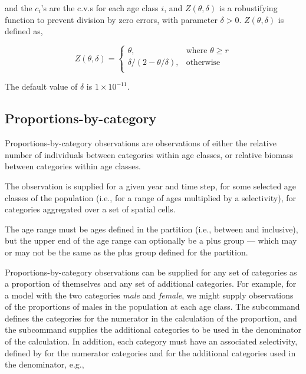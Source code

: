 and the $c_i$'s are the c.v.s for each age class $i$, and $Z \left(\theta,\delta \right)$ is a robustifying function to prevent division by zero errors, with parameter $\delta>0$. $Z \left(\theta,\delta \right)$ is defined as,

\begin{equation}
   Z \left(\theta,\delta \right) = \begin{cases}
	  \theta, & \text{where $\theta \ge r$} \\
	  \delta/\left( 2-\theta/\delta \right), & \text{otherwise} \\  
  \end{cases}
\end{equation}

The default value of $\delta$ is $1 \times 10^{-11}$.


\subsection{Proportions-by-category}

Proportions-by-category observations are observations of either the relative number of individuals between categories within age classes, or relative biomass between categories within age classes. 

The observation is supplied for a given year and time step, for some selected age classes of the population (i.e., for a range of ages multiplied by a selectivity), for categories aggregated over a set of spatial cells. 

The age range must be ages defined in the partition (i.e., between  and  inclusive), but the upper end of the age range can optionally be a plus group --- which may or may not be the same as the plus group defined for the partition. 

Proportions-by-category observations can be supplied for any set of categories as a proportion of themselves and any set of additional categories. For example, for a model with the two categories \emph{male} and \emph{female}, we might supply observations of the proportions of males in the population at each age class. The subcommand  defines the categories for the numerator in the calculation of the proportion, and the subcommand  supplies the additional categories to be used in the denominator of the calculation. In addition, each category must have an associated selectivity, defined by  for the numerator categories and  for the additional categories used in the denominator, e.g., 

